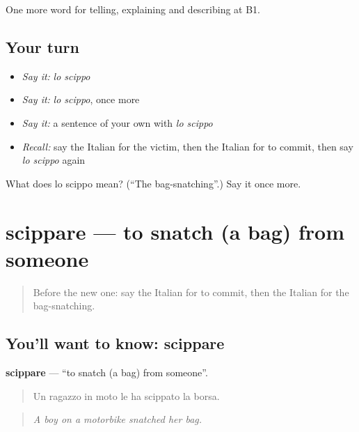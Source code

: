 \begin{grammarlens}[title={What you've built}]
One more word for telling, explaining and describing at B1.
\end{grammarlens}

\subsection*{Your turn}
\begin{itemize}
\raggedright
  \item \emph{Say it:} \emph{lo scippo}
  \item \emph{Say it:} \emph{lo scippo}, once more
  \item \emph{Say it:} a sentence of your own with \emph{lo scippo}
  \item \emph{Recall:} say the Italian for the victim, then the Italian for to commit, then say \emph{lo scippo} again
\end{itemize}

\begin{tcolorbox}[breakable,colback=teal!4,colframe=teal!35!black,title={Before you move on}]
What does lo scippo mean? (\textquotedblleft{}The bag-snatching\textquotedblright{}.) Say it once more.
\end{tcolorbox}
\section[scippare]{scippare — to snatch (a bag) from someone}

\label{lesson:IT-C291-scippare}



\begin{quote}
Before the new one: say the Italian for to commit, then the Italian for the bag-snatching.
\end{quote}

\subsection*{You'll want to know: scippare}
\textbf{scippare} — \textquotedblleft{}to snatch (a bag) from someone\textquotedblright{}.

\begin{quote}
Un ragazzo in moto le ha scippato la borsa.
\end{quote}

\begin{quote}
\emph{A boy on a motorbike snatched her bag.}
\end{quote}

